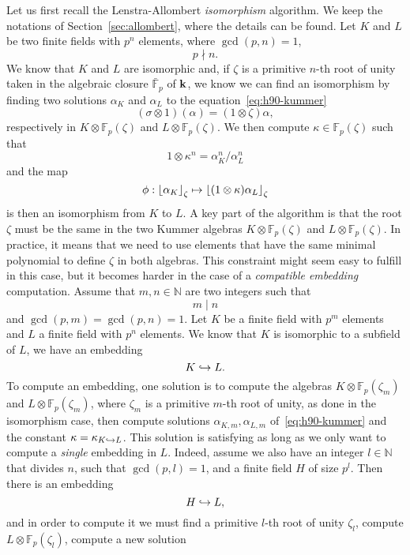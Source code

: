 Let us first recall the Lenstra-Allombert \emph{isomorphism} algorithm. We keep
the notations of Section~\ref{sec:allombert}, where the details can be found.
Let $K$ and $L$ be two finite fields with $p^n$ elements, where $\gcd(p, n) =
1$, \ie
\[
  p\nmid n.
\]
We know that $K$ and $L$ are isomorphic and, if $\zeta$ is a primitive $n$-th
root of unity taken in the algebraic closure $\bar{\mathbb{F}}_p$ of $\mathbf{k}$, we know
%
we can find an isomorphism by
finding two solutions $\alpha_K$ and $\alpha_L$ to the equation~\eqref{eq:h90-kummer}
\[
  (\sigma\otimes1)(\alpha) = (1\otimes\zeta)\alpha,
\]
respectively in $K\otimes\mathbb{F}_p(\zeta)$ and $L\otimes\mathbb{F}_p(\zeta)$.
We then compute $\kappa\in\mathbb{F}_p(\zeta)$ such that
\[
  1\otimes\kappa^n = \alpha_K^n/\alpha_L^n
\]
and the map
\[
  \phi:\left\lfloor \alpha_K \right\rfloor_{\zeta}\mapsto\left\lfloor (1\otimes\kappa)\alpha_L \right\rfloor_{\zeta}
\]
is then an isomorphism from $K$ to $L$. A key part of the algorithm is that the
root $\zeta$ must be the same in the two Kummer algebras
$K\otimes\mathbb{F}_p(\zeta)$ and $L\otimes\mathbb{F}_p(\zeta)$. In practice, it
means that we need to use elements that have the same minimal polynomial to
define $\zeta$ in both algebras. This constraint might seem easy to fulfill in
this case, but it becomes harder in the case of a \emph{compatible embedding}
computation. Assume that $m, n\in\mathbb{N}$ are two integers such that
\[
  m\mid n
\]
and $\gcd(p, m)=\gcd(p, n)=1$. Let $K$ be a finite field with $p^m$ elements and
$L$ a finite field with $p^n$ elements. We know that $K$ is isomorphic to a
subfield of $L$, \ie we have an embedding
\[
  K\hookrightarrow L.
\]
To compute an embedding, one solution is to compute the algebras
$K\otimes\mathbb{F}_p(\zeta_m)$ and
$L\otimes\mathbb{F}_p(\zeta_m)$, where $\zeta_m$ is a primitive $m$-th root of
unity, as done in the isomorphism case, then compute solutions
$\alpha_{K, m}, \alpha_{L, m}$ of~\eqref{eq:h90-kummer} and the constant
$\kappa=\kappa_{K\hookrightarrow L}$. This solution is satisfying as long as we only want
to compute a \emph{single} embedding in $L$. Indeed, assume we also have an
integer $l\in\mathbb{N}$ that divides $n$, such that $\gcd(p, l)=1$, and a
finite field $H$ of size $p^l$. Then there is an embedding
\[
  H\hookrightarrow L,
\]
and in order to compute it we must find a primitive $l$-th root of unity
$\zeta_l$, compute $L\otimes\mathbb{F}_p(\zeta_l)$, compute a new solution
